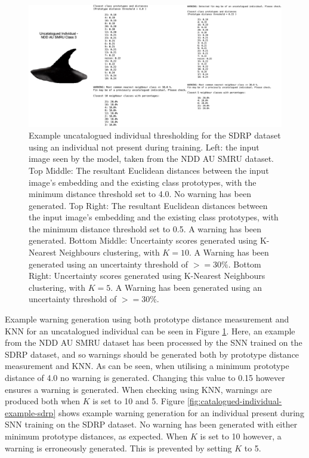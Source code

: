 \begin{figure}[t]
	\begin{center}
		\includegraphics[width=0.9\linewidth]{Chapter7/figs/uncatalogued-individual-thresholding-updated.png}
	\end{center}
	\caption[Example uncatalogued individual thresholding for the SDRP dataset using an individual not present during training.]{Example uncatalogued individual thresholding for the SDRP dataset using an individual not present during training. Left: the input image seen by the model, taken from the NDD AU SMRU dataset.  Top Middle: The resultant Euclidean distances between the input image's embedding and the existing class prototypes, with the minimum distance threshold set to 4.0. No warning has been generated. Top Right: The resultant Euclidean distances between the input image's embedding and the existing class prototypes, with the minimum distance threshold set to 0.5. A warning has been generated. Bottom Middle: Uncertainty scores generated using K-Nearest Neighbours clustering, with $K = 10$. A Warning has been generated using an uncertainty threshold of $>=30\%$. Bottom Right: Uncertainty scores generated using K-Nearest Neighbours clustering, with $K = 5$. A Warning has been generated using an uncertainty threshold of $>=30\%$.}
	\label{fig:uncatalogued-individual-example-sdrp}
\end{figure}

Example warning generation using both prototype distance measurement and KNN for an uncatalogued individual can be seen in Figure \ref{fig:uncatalogued-individual-example-sdrp}. Here, an example from the NDD AU SMRU dataset has been processed by the SNN trained on the SDRP dataset, and so warnings should be generated both by prototype distance measurement and KNN. As can be seen, when utilising a minimum prototype distance of 4.0 no warning is generated. Changing this value to 0.15 however ensures a warning is generated. When checking using KNN, warnings are produced both when $K$ is set to 10 and 5. Figure \ref{fig:catalogued-individual-example-sdrp} shows example warning generation for an individual present during SNN training on the SDRP dataset. No warning has been generated with either minimum prototype distances, as expected. When $K$ is set to 10 however, a warning is erroneously generated. This is prevented by setting $K$ to 5. 

